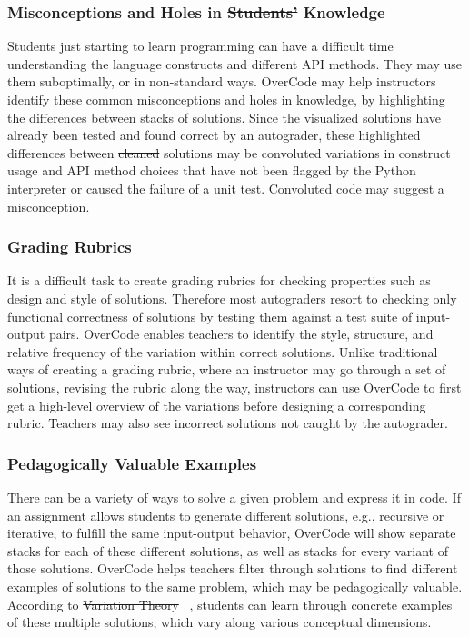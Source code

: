 \documentclass[12pt,twoside]{mitthesis}
\providecommand{\DIFaddtex}[1]{{\protect\color{blue}\uwave{#1}}} %
\providecommand{\DIFdeltex}[1]{{\protect\color{red}\sout{#1}}}                      %
\providecommand{\DIFaddbegin}{} %
\providecommand{\DIFaddend}{} %
\providecommand{\DIFdelbegin}{} %
\providecommand{\DIFdelend}{} %
\providecommand{\DIFadd}[1]{\texorpdfstring{\DIFaddtex{#1}}{#1}} %
\providecommand{\DIFdel}[1]{\texorpdfstring{\DIFdeltex{#1}}{}} %
\begin{document}
{{{{{{{{{{\subsubsection{Misconceptions and Holes in \DIFdelbegin \DIFdel{Students' }\DIFdelend \DIFaddbegin \DIFadd{Student }\DIFaddend Knowledge}
Students just starting to learn programming can have a difficult time understanding the language constructs and different API methods. They may use them suboptimally, or in non-standard ways. OverCode may help instructors identify these common misconceptions and holes in knowledge, by highlighting the differences between stacks of solutions. Since the visualized solutions have already been tested and found correct by an autograder, these highlighted differences between \DIFdelbegin \DIFdel{cleaned }\DIFdelend \DIFaddbegin \DIFadd{platonic }\DIFaddend solutions may be convoluted variations in construct usage and API method choices that have not been flagged by the Python interpreter or caused the failure of a unit test. Convoluted code may suggest a misconception.

\DIFaddbegin {}

\DIFaddend \subsubsection{Grading Rubrics}
It is a difficult task to create grading rubrics for checking properties such as design and style of solutions. Therefore most autograders resort to checking only functional correctness of solutions by testing them against a test suite of input-output pairs. OverCode enables teachers to identify the style, structure, and relative frequency of the variation within correct solutions. Unlike traditional ways of creating a grading rubric, where an instructor may go through a set of solutions, revising the rubric along the way, instructors can use OverCode to first get a high-level overview of the variations before designing a corresponding rubric. Teachers may also see incorrect solutions not caught by the autograder.

\subsubsection{Pedagogically Valuable Examples} 
There can be a variety of ways to solve a given problem and express it in code. If an assignment allows students to generate different solutions, e.g., recursive or iterative, to fulfill the same input-output behavior, OverCode will show separate stacks for each of these different solutions, as well as stacks for every variant of those solutions. OverCode helps teachers filter through solutions to find different examples of solutions to the same problem, which may be pedagogically valuable. According to \DIFdelbegin \DIFdel{Variation Theory }\DIFdelend \DIFaddbegin \DIFadd{variation theory }\DIFaddend ~\cite{marton13}, students can learn through concrete examples of these multiple solutions, which vary along \DIFdelbegin \DIFdel{various }\DIFdelend \DIFaddbegin \DIFadd{different }\DIFaddend conceptual dimensions.
}}}}}}}}}}
\end{document}
